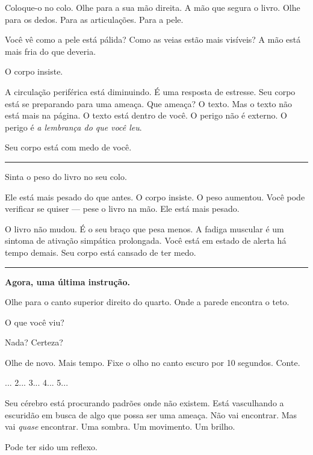 \noindent Coloque-o no colo. Olhe para a sua mão direita. A mão que segura o livro. Olhe para os dedos. Para as articulações. Para a pele.

\noindent Você vê como a pele está pálida? Como as veias estão mais visíveis? A mão está mais fria do que deveria.

\noindent O corpo insiste.

\noindent A circulação periférica está diminuindo. É uma resposta de estresse. Seu corpo está se preparando para uma ameaça. Que ameaça? O texto. Mas o texto não está mais na página. O texto está dentro de você. O perigo não é externo. O perigo é \textit{a lembrança do que você leu}.

\noindent Seu corpo está com medo de você.

\vspace{0.5em}\noindent\rule{\textwidth}{0.5pt}\vspace{0.5em}

\noindent Sinta o peso do livro no seu colo.

\noindent Ele está mais pesado do que antes. O corpo insiste. O peso aumentou. Você pode verificar se quiser --- pese o livro na mão. Ele está mais pesado.

\noindent O livro não mudou.
É o seu braço que pesa menos.
A fadiga muscular é um sintoma de ativação simpática prolongada.
Você está em estado de alerta há tempo demais.
Seu corpo está cansado de ter medo.

\vspace{0.5em}\noindent\rule{\textwidth}{0.5pt}\vspace{0.5em}

\noindent \textbf{Agora, uma última instrução.}

\noindent Olhe para o canto superior direito do quarto. Onde a parede encontra o teto.

\noindent O que você viu?

\noindent Nada? Certeza?

\noindent Olhe de novo. Mais tempo. Fixe o olho no canto escuro por 10 segundos. Conte.

... 2... 3... 4... 5...

\noindent Seu cérebro está procurando padrões onde não existem. Está vasculhando a escuridão em busca de algo que possa ser uma ameaça. Não vai encontrar. Mas vai \textit{quase} encontrar. Uma sombra. Um movimento. Um brilho.

\noindent Pode ter sido um reflexo.

